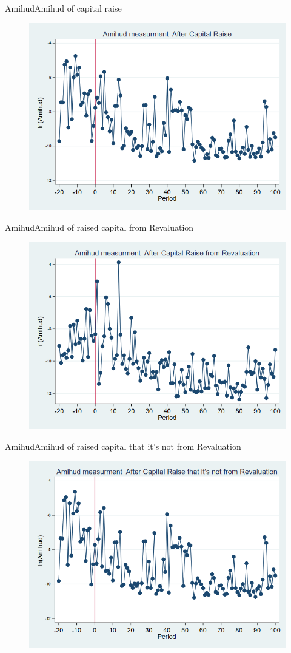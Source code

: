 \documentclass{beamer}
\begin{document}
\begin{frame}{Amihud}{Amihud of capital raise}
\begin{figure}
\centering
\includegraphics[width=0.7\linewidth]{Amihud}
\label{fig:amihud}
\end{figure}
\end{frame}



\begin{frame}{Amihud}{Amihud of raised capital from Revaluation}
\begin{figure}
\centering
\includegraphics[width=0.7\linewidth]{Amihud_Revaluation}
\label{fig:amihudrevaluation}
\end{figure}
\end{frame}

\begin{frame}{Amihud}{Amihud of raised capital that it's not from Revaluation}
\begin{figure}
\centering
\includegraphics[width=0.7\linewidth]{Amihud_NoRevaluation}
\label{fig:amihudnorevaluation}
\end{figure}
\end{frame}
\end{document}
